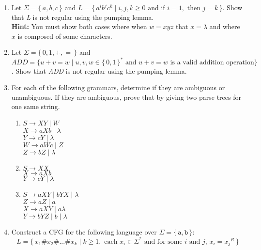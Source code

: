 \documentclass[11pt, article, oneside]{memoir}
\newcommand{\set}[1]{\{\, #1\, \}}
\begin{document}
\begin{enumerate}
    \item
        Let \(\Sigma = \set{a, b, c}\) and \(L = \set{ {a^i}{b^j}{c^k} \mid i, j, k \ge 0 \text{ and if } i = 1,  \text{ then } j = k}\). Show that \textit{L} is not regular using the pumping lemma.
        \\\textbf{Hint:} You must show both cases where when \(w = xyz\) that \(x = \lambda\) and where \(x\) is composed of some characters.
    \item 
        Let \(\Sigma = \set{0, 1, +, =}\) and \(ADD = \{ u+v=w \mid u, v, w \in \set{0, 1}^* \text{ and } u+v=w \text{ is a valid addition operation}\}\). Show that \textit{ADD} is not regular using the pumping lemma.
    \item
        For each of the following grammars, determine if they are ambiguous or unambiguous. If they are ambiguous, prove that by giving two parse trees for one same string.
        \begin{enumerate}
            \item
                \(S \rightarrow XY \mid W \)
                \\\(X \rightarrow aXb \mid \lambda\)
                \\\(Y \rightarrow cY \mid \lambda\)
                \\\(W \rightarrow aWc \mid Z\)
                \\\(Z \rightarrow bZ \mid \lambda\)
            \item
                \(S \rightarrow XX \)
                \\\(X \rightarrow aXb\)
                \\\(Y \rightarrow cY \mid \lambda\)
            \item
                \(S \rightarrow aXY \mid bYX \mid \lambda \)
                \\\(Z \rightarrow aZ \mid a\)
                \\\(X \rightarrow aXY \mid a \lambda\)
                \\\(Y \rightarrow bYZ \mid b \mid \lambda\) 
        \end{enumerate}
    \item
        Construct a CFG for the following language over \(\Sigma = \set{\texttt{a}, \texttt{b}}\):
        \[
            L = \set{x_1\#x_2\#...\#x_k \mid k \ge 1, \text{ each } x_i \in \Sigma^* \text{ and for some } i \text{ and } j \text{, } x_i = {x_j}^R}
        \]    
\end{enumerate}
\end{document}
